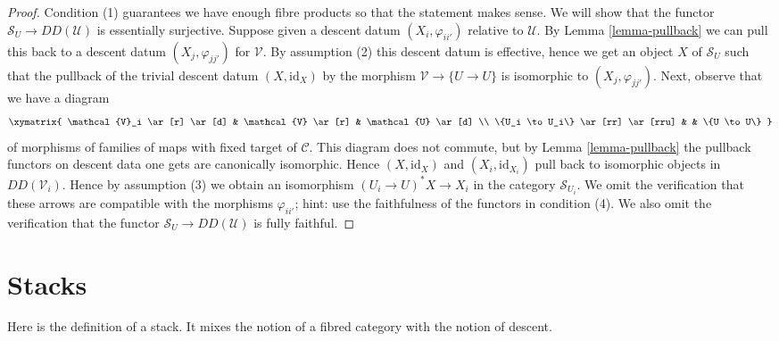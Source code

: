 \begin{proof}
Condition (1) guarantees we have enough fibre products so that
the statement makes sense.
We will show that the functor $\mathcal{S}_U \to DD(\mathcal{U})$ is
essentially surjective. Suppose given a descent datum
$(X_i, \varphi_{ii'})$ relative to $\mathcal{U}$.
By Lemma \ref{lemma-pullback} we can pull this back to a descent datum
$(X_j, \varphi_{jj'})$ for $\mathcal{V}$.
By assumption (2) this descent datum is effective, hence we
get an object $X$ of $\mathcal{S}_U$ such that the
pullback of the trivial descent datum $(X, \text{id}_X)$
by the morphism $\mathcal{V} \to \{U \to U\}$ is isomorphic to
$(X_j, \varphi_{jj'})$. Next, observe that we have a diagram
$$
\xymatrix{
\mathcal{V}_i \ar[r] \ar[d] &
\mathcal{V} \ar[r] &
\mathcal{U} \ar[d] \\
\{U_i \to U_i\} \ar[rr] \ar[rru] & &
\{U \to U\}
}
$$
of morphisms of families of maps with fixed target of $\mathcal{C}$.
This diagram does not commute, but by Lemma \ref{lemma-pullback}
the pullback functors on descent data one gets are canonically
isomorphic. Hence $(X, \text{id}_X)$ and $(X_i, \text{id}_{X_i})$
pull back to isomorphic objects in $DD(\mathcal{V}_i)$.
Hence by assumption (3) we obtain an isomorphism
$(U_i \to U)^*X \to X_i$ in the category $\mathcal{S}_{U_i}$.
We omit the verification that these arrows are compatible
with the morphisms $\varphi_{ii'}$; hint: use the faithfulness
of the functors in condition (4).
We also omit the verification that the functor
$\mathcal{S}_U \to DD(\mathcal{U})$ is
fully faithful.
\end{proof}













\section{Stacks}
\label{section-definition}

\noindent
Here is the definition of a stack. It mixes the notion of a fibred
category with the notion of descent.

